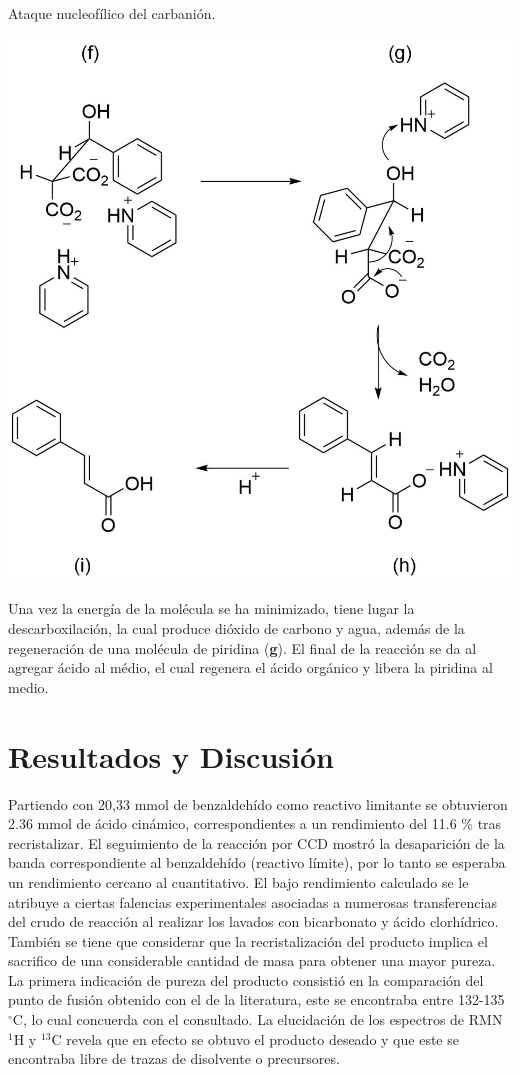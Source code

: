 \documentclass[fleqn,11pt]{SelfArx}
\begin{document}
\begin{scheme}[h]
	\centering
	\caption{Ataque nucleofílico del carbanión.}
	\includegraphics[width=0.9\linewidth]{structures/mechanism3.png}
	\label{sch: mechanism3}
\end{scheme}

Una vez la energía de la molécula se ha minimizado, tiene lugar la descarboxilación, la cual produce dióxido de carbono y agua, además de la regeneración de una molécula de piridina (\textbf{g}). El final de la reacción se da al agregar ácido al médio, el cual regenera el ácido orgánico y libera la piridina al medio.


\section{Resultados y Discusi\'on}
Partiendo con 20,33 mmol de benzaldehído como reactivo limitante se obtuvieron 2.36 mmol de ácido cinámico, correspondientes a un rendimiento del 11.6 \% tras recristalizar. El seguimiento de la reacción por CCD mostró la desaparición de la banda correspondiente al benzaldehído (reactivo límite), por lo tanto se esperaba un rendimiento cercano al cuantitativo. El bajo rendimiento calculado se le atribuye a ciertas falencias experimentales asociadas a numerosas transferencias del crudo de reacción al realizar los lavados con bicarbonato y ácido clorhídrico. También se tiene que considerar que la recristalización del producto implica el sacrifico de una considerable cantidad de masa para obtener una mayor pureza. La primera indicación de pureza del producto consistió en la comparación del punto de fusión obtenido con el de la literatura, este se encontraba entre 132-135 $^\circ$C, lo cual concuerda con el consultado. La elucidación de los espectros de RMN $^1$H y $^{13}$C revela que en efecto se obtuvo el producto deseado y que este se encontraba libre de trazas de disolvente o precursores.
\end{document}
